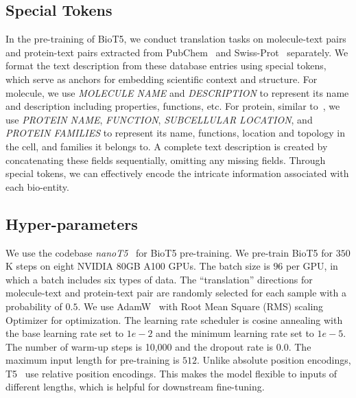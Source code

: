 \documentclass[11pt]{article}
\newcommand{\method}{{BioT5}}
\begin{document}
\subsection{Special Tokens}
\label{sec:special_tokens}
In the pre-training of \method{}, we conduct translation tasks on molecule-text pairs and protein-text pairs extracted from PubChem~\citep{kim2023pubchem} and Swiss-Prot~\citep{boutet2007uniprotkb} separately.
We format the text description from these database entries using special tokens, which serve as anchors for embedding scientific context and structure.
For molecule, we use \textit{MOLECULE NAME} and \textit{DESCRIPTION} to represent its name and description including properties, functions, etc.
For protein, similar to~\citet{xu2023protst}, we use \textit{PROTEIN NAME}, \textit{FUNCTION}, \textit{SUBCELLULAR LOCATION}, and \textit{PROTEIN FAMILIES} to represent its name, functions, location and topology in the cell, and families it belongs to.
A complete text description is created by concatenating these fields sequentially, omitting any missing fields.
Through special tokens, we can effectively encode the intricate information associated with each bio-entity.
\subsection{Hyper-parameters}
We use the codebase {\em nanoT5}~\citep{Nawrot_nanoT5_2023} for \method{} pre-training.
We pre-train \method{} for $350$K steps on eight NVIDIA 80GB A100 GPUs.
The batch size is $96$ per GPU, in which a batch includes six types of data.
The ``translation'' directions for molecule-text and protein-text pair are randomly selected for each sample with a probability of $0.5$.
We use AdamW~\citep{DBLP:conf/iclr/LoshchilovH19} with Root Mean Square (RMS) scaling Optimizer for optimization.
The learning rate scheduler is cosine annealing with the base learning rate set to $1e-2$ and the minimum learning rate set to $1e-5$. 
The number of warm-up steps is 10,000 and the dropout rate is $0.0$.
The maximum input length for pre-training is $512$. 
Unlike absolute position encodings, T5~\citep{raffel2020exploring} use relative position encodings.
This makes the model flexible to inputs of different lengths, which is helpful for downstream fine-tuning.
\end{document}
